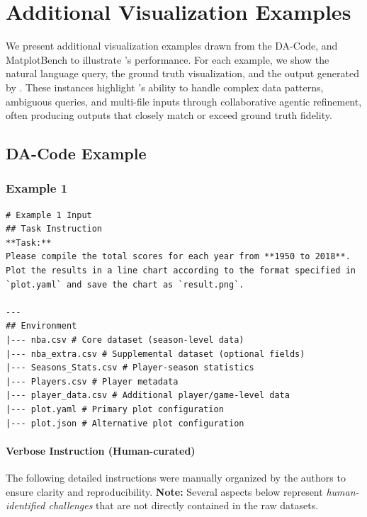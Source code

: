 \section{Additional Visualization Examples}\label{appendix:add}

We present additional visualization examples drawn from the DA-Code, and MatplotBench to illustrate \methodname{}'s performance. For each example, we show the natural language query, the ground truth visualization, and the output generated by \methodname{}. These instances highlight \methodname{}'s ability to handle complex data patterns, ambiguous queries, and multi-file inputs through collaborative agentic refinement, often producing outputs that closely match or exceed ground truth fidelity.

\subsection{DA-Code Example}
\subsubsection{Example 1}
\begin{verbatim}
# Example 1 Input
## Task Instruction
**Task:**  
Please compile the total scores for each year from **1950 to 2018**.  
Plot the results in a line chart according to the format specified in `plot.yaml` and save the chart as `result.png`.

---
## Environment
|--- nba.csv # Core dataset (season-level data)
|--- nba_extra.csv # Supplemental dataset (optional fields)
|--- Seasons_Stats.csv # Player-season statistics
|--- Players.csv # Player metadata
|--- player_data.csv # Additional player/game-level data
|--- plot.yaml # Primary plot configuration
|--- plot.json # Alternative plot configuration
\end{verbatim}

\paragraph{Verbose Instruction (Human-curated)}

The following detailed instructions were manually organized by the authors to ensure clarity and reproducibility. 
\textbf{Note:} Several aspects below represent \emph{human-identified challenges} that are not directly contained in the raw datasets.

